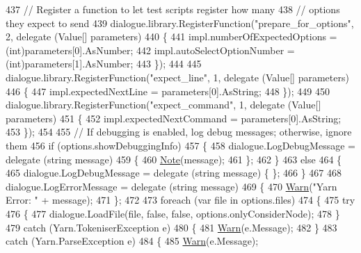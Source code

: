 \begin{DoxyCode}
437             \textcolor{comment}{// Register a function to let test scripts register how many}
438             \textcolor{comment}{// options they expect to send}
439             dialogue.library.RegisterFunction(\textcolor{stringliteral}{"prepare\_for\_options"}, 2, delegate (Value[] parameters)
440             \{
441                 impl.numberOfExpectedOptions = (int)parameters[0].AsNumber;
442                 impl.autoSelectOptionNumber = (int)parameters[1].AsNumber;
443             \});
444 
445             dialogue.library.RegisterFunction(\textcolor{stringliteral}{"expect\_line"}, 1, delegate (Value[] parameters)
446             \{
447                 impl.expectedNextLine = parameters[0].AsString;
448             \});
449 
450             dialogue.library.RegisterFunction(\textcolor{stringliteral}{"expect\_command"}, 1, delegate (Value[] parameters)
451             \{
452                 impl.expectedNextCommand = parameters[0].AsString;
453             \});
454 
455             \textcolor{comment}{// If debugging is enabled, log debug messages; otherwise, ignore them}
456             \textcolor{keywordflow}{if} (options.showDebuggingInfo)
457             \{
458                 dialogue.LogDebugMessage = delegate (\textcolor{keywordtype}{string} message)
459                 \{
460                     \hyperlink{a00197_a939cc9e943c574b36c6af93e9c772702}{Note}(message);
461                 \};
462             \}
463             \textcolor{keywordflow}{else}
464             \{
465                 dialogue.LogDebugMessage = delegate (\textcolor{keywordtype}{string} message) \{ \};
466             \}
467 
468             dialogue.LogErrorMessage = delegate (\textcolor{keywordtype}{string} message)
469             \{
470                 \hyperlink{a00197_a979bb6f049b6c5294f745a19e24ddd9d}{Warn}(\textcolor{stringliteral}{"Yarn Error: "} + message);
471             \};
472 
473             \textcolor{keywordflow}{foreach} (var file \textcolor{keywordflow}{in} options.files)
474             \{
475                 \textcolor{keywordflow}{try}
476                 \{
477                     dialogue.LoadFile(file, \textcolor{keyword}{false}, \textcolor{keyword}{false}, options.onlyConsiderNode);
478                 \}
479                 \textcolor{keywordflow}{catch} (Yarn.TokeniserException e)
480                 \{
481                     \hyperlink{a00197_a979bb6f049b6c5294f745a19e24ddd9d}{Warn}(e.Message);
482                 \}
483                 \textcolor{keywordflow}{catch} (Yarn.ParseException e)
484                 \{
485                     \hyperlink{a00197_a979bb6f049b6c5294f745a19e24ddd9d}{Warn}(e.Message);

\end{DoxyCode}
